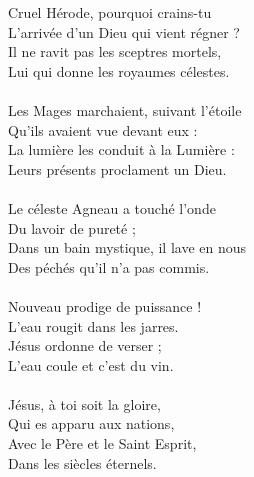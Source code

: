 Cruel Hérode, pourquoi crains-tu\\
L'arrivée d'un Dieu qui vient régner ?\\
Il ne ravit pas les sceptres mortels,\\
Lui qui donne les royaumes célestes.\\
\\
Les Mages marchaient, suivant l'étoile\\
Qu'ils avaient vue devant eux :\\
La lumière les conduit à la Lumière :\\
Leurs présents proclament un Dieu.\\
\\
Le céleste Agneau a touché l'onde\\
Du lavoir de pureté ;\\
Dans un bain mystique, il lave en nous\\
Des péchés qu'il n'a pas commis.\\
\\
Nouveau prodige de puissance !\\
L'eau rougit dans les jarres.\\
Jésus ordonne de verser ;\\
L'eau coule et c'est du vin.\\
\\
Jésus, à toi soit la gloire,\\
Qui es apparu aux nations,\\
Avec le Père et le Saint Esprit,\\
Dans les siècles éternels.